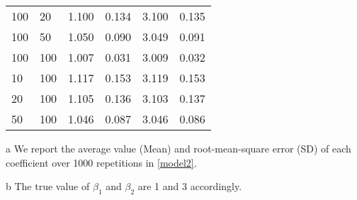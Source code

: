 \documentclass[a4paper]{article}
\begin{document}
\begin{table}[]
\begin{threeparttable}
\begin{tabular}{llllll}
100 & 20  & 1.100                                                       & 0.134 & 3.100                                                       & 0.135 \\
100 & 50  & 1.050                                                       & 0.090 & 3.049                                                       & 0.091 \\
100 & 100 & 1.007                                                       & 0.031 & 3.009                                                       & 0.032 \\
10  & 100 & 1.117                                                       & 0.153 & 3.119                                                       & 0.153 \\
20  & 100 & 1.105                                                       & 0.136 & 3.103                                                       & 0.137 \\
50  & 100 & 1.046                                                       & 0.087 & 3.046                                                       & 0.086 \\ \hline
\end{tabular}

\begin{tablenotes}
        \footnotesize
         \item[a]  We report the average value (Mean) and root-mean-square error (SD) of each coefficient over 1000 repetitions in \eqref{model2}.
       \item[b] The true value of $\beta_1$ and $\beta_2$ are 1 and 3 accordingly.
      \end{tablenotes}
\end{threeparttable}

\end{table}

\clearpage
\end{document}

